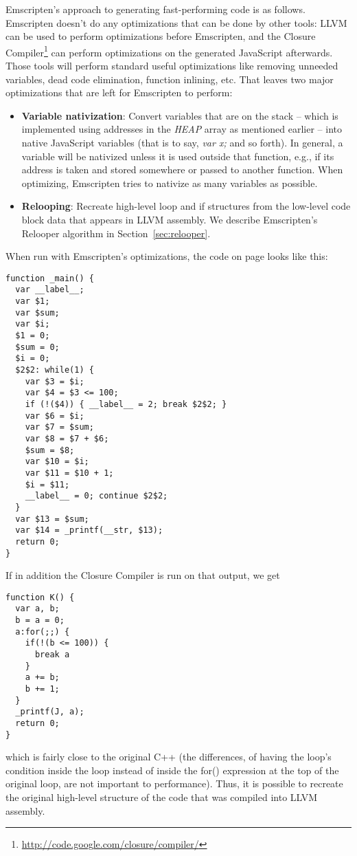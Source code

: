 \documentclass[preprint,10pt]{sigplanconf}
\begin{document}
Emscripten's approach to generating fast-performing code is as
follows. Emscripten doesn't do any
optimizations that can be done by other tools:
LLVM can be used to perform optimizations before Emscripten, and
the Closure Compiler\footnote{\url{http://code.google.com/closure/compiler/}}
can perform optimizations on the generated JavaScript afterwards. Those
tools will perform standard useful optimizations like removing unneeded variables, dead code elimination,
function inlining, etc.
That leaves two major optimizations that are left for Emscripten
to perform:
\begin{itemize}
\item \textbf{Variable nativization}: Convert variables
      that are on the stack -- which is implemented using addresses in the \emph{HEAP} array
      as mentioned earlier -- into native JavaScript variables (that is to say, \emph{var x;} and so forth). In general,
      a variable will be nativized unless it is used
      outside that function, e.g., if its address is taken and stored somewhere
      or passed to another function. When optimizing, Emscripten tries to nativize
      as many variables as possible.
\item \textbf{Relooping}: Recreate high-level loop and if structures
      from the low-level code block data that appears in LLVM assembly.
      We describe Emscripten's Relooper algorithm in Section~\ref{sec:relooper}.
\end{itemize}

When run with Emscripten's optimizations, the code on page \pageref{code:example} looks
like this:
\begin{verbatim}
function _main() {
  var __label__;
  var $1;
  var $sum;
  var $i;
  $1 = 0;
  $sum = 0;
  $i = 0;
  $2$2: while(1) {
    var $3 = $i;
    var $4 = $3 <= 100;
    if (!($4)) { __label__ = 2; break $2$2; }
    var $6 = $i;
    var $7 = $sum;
    var $8 = $7 + $6;
    $sum = $8;
    var $10 = $i;
    var $11 = $10 + 1;
    $i = $11;
    __label__ = 0; continue $2$2;
  }
  var $13 = $sum;
  var $14 = _printf(__str, $13);
  return 0;
}
\end{verbatim}
If in addition the Closure Compiler is run on that output, we get
\begin{verbatim}
function K() {
  var a, b;
  b = a = 0;
  a:for(;;) {
    if(!(b <= 100)) {
      break a
    }
    a += b;
    b += 1;
  }
  _printf(J, a);
  return 0;
}
\end{verbatim}
which is fairly close to the original C++ (the differences, of
having the loop's condition inside the loop instead of inside
the for() expression at the top of the original loop, are not important to performance). Thus, it is possible
to recreate the original high-level structure of the code that
was compiled into LLVM assembly.
\end{document}
